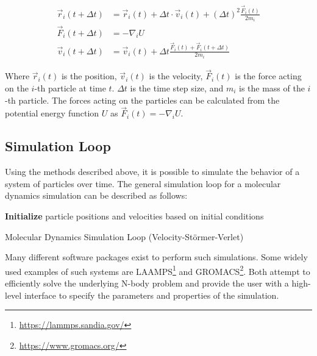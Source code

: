 \begin{align}
      \vec{r}_i(t + \Delta t) & = \vec{r}_i(t) + \Delta t \cdot \vec{v}_i(t) + (\Delta t)^2 \frac{\vec{F}_i(t)}{2m_i} \label{eq:verlet_position} \\
      \vec{F}_i(t + \Delta t) & = -\nabla_i U \label{eq:verlet_force}                                                                            \\
      \vec{v}_i(t + \Delta t) & = \vec{v}_i(t) + \Delta t  \frac{\vec{F}_i(t) + \vec{F}_i(t + \Delta t)}{2m_i} \label{eq:verlet_velocity}
\end{align}

Where $\vec{r}_i(t)$ is the position, $\vec{v}_i(t)$ is the velocity, $\vec{F}_i(t)$ is the force acting on the $i$-th particle at time $t$. $\Delta t$ is the time step size, and $m_i$ is the mass of the $i$-th particle. The forces acting on the particles can be calculated from the potential energy function $U$ as $\vec{F}_i(t) = -\nabla_i U$.

\subsection{Simulation Loop}

Using the methods described above, it is possible to simulate the behavior of a system of particles over time. The general simulation loop for a molecular dynamics simulation can be described as follows:


\begin{algorithm}
      \SetAlgoLined
      \textbf{Initialize} particle positions and velocities based on initial conditions\;
      \vspace{0.2cm}
      \caption{Molecular Dynamics Simulation Loop (Velocity-Störmer-Verlet)}
\end{algorithm}


Many different software packages exist to perform such simulations. Some widely used examples of such systems are LAAMPS\footnote{\url{https://lammps.sandia.gov/}} and GROMACS\footnote{\url{https://www.gromacs.org/}}. Both attempt to efficiently solve the underlying N-body problem and provide the user with a high-level interface to specify the parameters and properties of the simulation.

